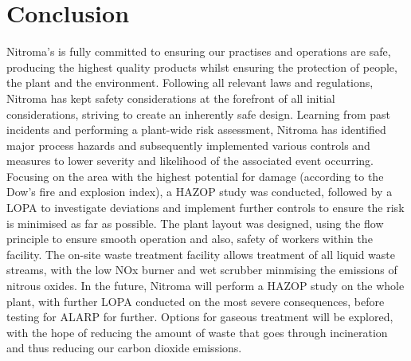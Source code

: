 \section{Conclusion}

Nitroma’s is fully committed to ensuring our practises and operations are safe, producing the highest quality products whilst ensuring the protection of people, the plant and the environment. Following all relevant laws and regulations, Nitroma has kept safety considerations at the forefront of all initial considerations, striving to create an inherently safe design. Learning from past incidents and performing a plant-wide risk assessment, Nitroma has identified major process hazards and subsequently implemented various controls and measures to lower severity and likelihood of the associated event occurring. Focusing on the area with the highest potential for damage (according to the Dow’s fire and explosion index), a HAZOP study was conducted, followed by a LOPA to investigate deviations and implement further controls to ensure the risk is minimised as far as possible. The plant layout was designed, using the flow principle to ensure smooth operation and also, safety of workers within the facility. The on-site waste treatment facility allows treatment of all liquid waste streams, with the low NOx burner and wet scrubber minmising the emissions of nitrous oxides. In the future, Nitroma will perform a HAZOP study on the whole plant, with further LOPA conducted on the most severe consequences, before testing for ALARP for further. Options for gaseous treatment will be explored, with the hope of reducing the amount of waste that goes through incineration and thus reducing our carbon dioxide emissions. 